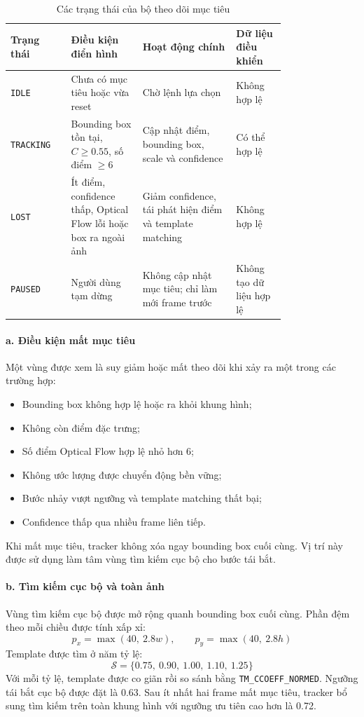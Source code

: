 \documentclass[../DoAn.tex]{subfiles}
\begin{document}
\begin{table}[htbp]
    \centering
    \caption{Các trạng thái của bộ theo dõi mục tiêu}
    \label{tab:trangthai_tracker}
    \renewcommand{\arraystretch}{1.3}
    \begin{tabular}{|l|p{0.26\linewidth}|p{0.34\linewidth}|p{0.18\linewidth}|}
        \hline
        \textbf{Trạng thái} & \textbf{Điều kiện điển hình} & \textbf{Hoạt động chính} & \textbf{Dữ liệu điều khiển} \\
        \hline
        \texttt{IDLE} & Chưa có mục tiêu hoặc vừa reset & Chờ lệnh lựa chọn & Không hợp lệ \\
        \hline
        \texttt{TRACKING} & Bounding box tồn tại, $C \geq 0.55$, số điểm $\geq 6$ & Cập nhật điểm, bounding box, scale và confidence & Có thể hợp lệ \\
        \hline
        \texttt{LOST} & Ít điểm, confidence thấp, Optical Flow lỗi hoặc box ra ngoài ảnh & Giảm confidence, tái phát hiện điểm và template matching & Không hợp lệ \\
        \hline
        \texttt{PAUSED} & Người dùng tạm dừng & Không cập nhật mục tiêu; chỉ làm mới frame trước & Không tạo dữ liệu hợp lệ \\
        \hline
    \end{tabular}
\end{table}

\paragraph{a. Điều kiện mất mục tiêu}
Một vùng được xem là suy giảm hoặc mất theo dõi khi xảy ra một trong các trường hợp:
\begin{itemize}
    \item Bounding box không hợp lệ hoặc ra khỏi khung hình;
    \item Không còn điểm đặc trưng;
    \item Số điểm Optical Flow hợp lệ nhỏ hơn 6;
    \item Không ước lượng được chuyển động bền vững;
    \item Bước nhảy vượt ngưỡng và template matching thất bại;
    \item Confidence thấp qua nhiều frame liên tiếp.
\end{itemize}
Khi mất mục tiêu, tracker không xóa ngay bounding box cuối cùng. Vị trí này được sử dụng làm tâm vùng tìm kiếm cục bộ cho bước tái bắt.

\paragraph{b. Tìm kiếm cục bộ và toàn ảnh}
Vùng tìm kiếm cục bộ được mở rộng quanh bounding box cuối cùng. Phần đệm theo mỗi chiều được tính xấp xỉ:
\[
p_x = \max(40,\ 2.8w), \qquad p_y = \max(40,\ 2.8h)
\]
Template được tìm ở năm tỷ lệ:
\[
\mathcal{S} = \{0.75,\ 0.90,\ 1.00,\ 1.10,\ 1.25\}
\]
Với mỗi tỷ lệ, template được co giãn rồi so sánh bằng \texttt{TM\_CCOEFF\_NORMED}. Ngưỡng tái bắt cục bộ được đặt là 0.63. Sau ít nhất hai frame mất mục tiêu, tracker bổ sung tìm kiếm trên toàn khung hình với ngưỡng ưu tiên cao hơn là 0.72.
\end{document}
